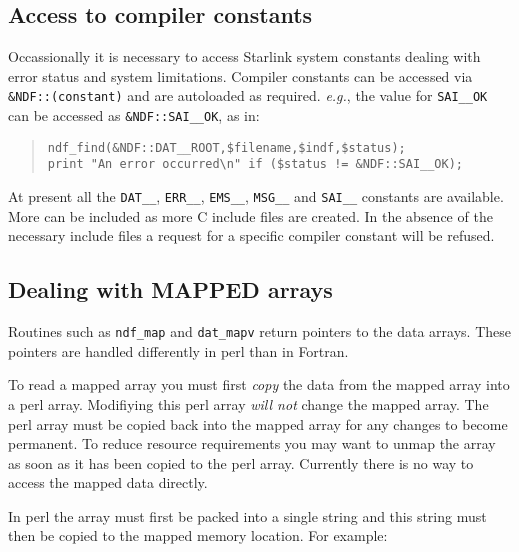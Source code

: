 \documentclass[twoside,11pt]{article}
\newcommand{\xlabel}[1]{}
\newenvironment{myquote}{\begin{quote}\begin{small}}{\end{small}\end{quote}}
\begin{document}
\subsection{\xlabel{access_to_compiler_constants}Access to compiler constants}%
\label{access_to_compiler_constants}

Occassionally it is necessary to access Starlink system constants
dealing with error status and system limitations.  Compiler constants
can be accessed via \texttt{\&NDF::(constant)} and are autoloaded as
required.  \emph{e.g.}, the value for \texttt{SAI\_\_OK} can be
accessed as \texttt{\&NDF::SAI\_\_OK}, as in:

\begin{myquote}
\begin{verbatim}
ndf_find(&NDF::DAT__ROOT,$filename,$indf,$status);
print "An error occurred\n" if ($status != &NDF::SAI__OK);
\end{verbatim}
\end{myquote}

At present all the \texttt{DAT\_\_}, \texttt{ERR\_\_}, \texttt{EMS\_\_},
\texttt{MSG\_\_} and \texttt{SAI\_\_} constants are available.  More
can be included as more C include files are created.  In the absence of
the necessary include files a request for a specific compiler constant
will be refused.

\subsection{\xlabel{dealing_with_mapped_arrays}Dealing with MAPPED arrays}%
\label{dealing_with_mapped_arrays}

Routines such as \texttt{ndf\_map} and \texttt{dat\_mapv} return
pointers to the data arrays. These pointers are handled differently in
perl than in Fortran.

To read a mapped array you must first \emph{copy\/} the data from the mapped
array into a perl array. Modifiying this perl array \emph{will not\/} change
the mapped array. The perl array must be copied back into the mapped
array for any changes to become permanent. To reduce resource requirements
you may want to unmap the array as soon as it has been copied to the
perl array. Currently there is no way to access the mapped data directly.

In perl the array must first be packed into a single string and this
string must then be copied to the mapped memory location.
For example:
\end{document}
